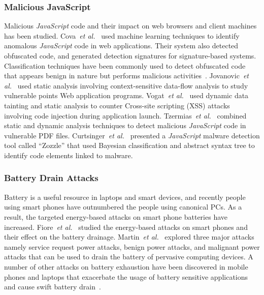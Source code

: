 \documentclass[acmlarge]{acmart}
\newcommand{\js}{{\em JavaScript}\xspace}
\newcommand{\etal}{{\em et al.}\xspace}
\begin{document}
\subsubsection*{Malicious JavaScript} Malicious \js code and their impact on web browsers and client machines has been studied. Cova~\etal~\cite{CovaKV10} used machine learning techniques to identify anomalous \js code in web applications. Their system also detected obfuscated code, and generated detection signatures for signature-based systems. Classification techniques have been commonly used to detect obfuscated code that appears benign in nature but performs malicious activities~\cite{LikarishJJ09,hou2010malicious,kejriwal2014method}. Jovanovic~\etal~\cite{JovanovicKK06} used static analysis involving context-sensitive data-flow analysis to study vulnerable points Web application programs. Vogat~\etal~\cite{VogtNJKKV07} used dynamic data tainting and static analysis to counter Cross-site scripting (XSS) attacks involving code injection during application launch. Tzermias~\etal~\cite{TzermiasSPM11} combined static and dynamic analysis techniques to detect malicious \js code in vulnerable PDF files. Curtsinger~\etal~\cite{CurtsingerLZS11} presented a \js malware detection tool called ``Zozzle'' that used Bayesian classification and abstract syntax tree
to identify code elements linked to malware. 


\subsubsection*{Battery Drain Attacks} Battery is a useful resource in laptops and smart devices, and recently people using smart phones have outnumbered the people using canonical PCs. As a result, the targeted energy-based attacks on smart phone batteries have increased. Fiore~\etal~\cite{FiorePCLS14} studied the energy-based attacks on smart phones and their effect on the battery drainage. Martin~\etal~\cite{MartinHHK04} explored three major attacks namely service request
power attacks, benign power attacks, and malignant power attacks that can be used to drain the battery of pervasive computing devices. A number of other attacks on battery exhaustion have been discovered in mobile phones and laptops that exacerbate the usage of battery sensitive applications and cause swift battery drain~\cite{MoyersDMT10,BuennemeyerGMT07}. 
\end{document}

